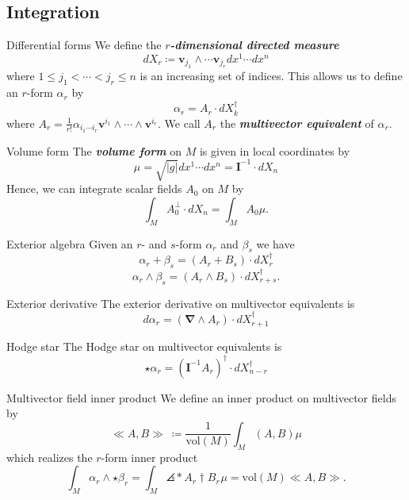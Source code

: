 \documentclass[aspectratio=169,handout]{beamer}
\newcommand\boldgreen[1]{\textcolor{lighter_csu_green}{\emph{\textbf{#1}}}}
\newcommand{\grad}{\boldsymbol{\nabla}}
\newcommand{\blade}[1]{\boldsymbol{#1}}
\newcommand{\multivecinnerproduct}[2]{\ll #1, #2\gg}
\newcommand{\pseudoscalar}{\blade{I}}
\DeclarePairedDelimiter\angles{\langle}{\rangle}
\newcommand{\proj}[2]{\angles*{#2}_{#1}}
\begin{document}
\subsection{Integration}

\begin{frame}{Differential forms}
    We define the \boldgreen{$r$-dimensional directed measure}
    \[
    dX_r\coloneqq \blade{v}_{j_1} \wedge \cdots \blade{v}_{j_r} dx^1 \cdots dx^n
    \]
    where $1\leq j_1<\cdots<j_r\leq n$ is an increasing set of indices. This allows us to define an $r$-form $\alpha_r$ by
    \[
    \alpha_r = A_r \cdot dX_k^\dagger
    \]
    where $A_r = \frac{1}{r!} \alpha_{i_1 \cdots i_r} \blade{v}^{i_1} \wedge \cdots \wedge \blade{v}^{i_r}$. We call $A_r$ the \boldgreen{multivector equivalent} of $\alpha_r$.
\end{frame}

\begin{frame}{Volume form}
\vfill
    The \boldgreen{volume form} on $M$ is given in local coordinates by 
    \[
    \mu = \sqrt{|g|}dx^1\cdots dx^n = \pseudoscalar^{-1} \cdot dX_n
    \]
    Hence, we can integrate scalar fields $A_0$ on $M$ by
    \[
    \int_M A_0^\perp \cdot dX_n =  \int_M A_0 \mu.
    \]
\vfill
\end{frame}

\begin{frame}{Exterior algebra}
\vfill
Given an $r$- and $s$-form $\alpha_r$ and $\beta_s$ we have
\[
\alpha_r + \beta_s = (A_r+B_s) \cdot dX_r^\dagger
\]
\[
\alpha_r \wedge \beta_s = (A_r \wedge B_s) \cdot dX_{r+s}^\dagger.
\]
\vfill
\end{frame}

\begin{frame}{Exterior derivative}
\vfill
The exterior derivative on multivector equivalents is 
\[
d\alpha_r = (\grad \wedge A_r) \cdot dX_{r+1}^\dagger
\]
\vfill
\end{frame}

\begin{frame}{Hodge star}
\vfill
The Hodge star on multivector equivalents is
\[
\star \alpha_r = (\pseudoscalar^{-1} A_r)^\dagger \cdot dX_{n-r}^\dagger
\]
\vfill
\end{frame}


\begin{frame}{Multivector field inner product}
\vfill
We define an inner product on multivector fields by 
\[
\multivecinnerproduct{A}{B}~ \coloneqq \frac{1}{\textrm{vol}(M)} \int_M (A,B)\mu
\]
which realizes the $r$-form inner product
\[
\int_M \alpha_r \wedge \star \beta_r = \int_M \proj{}{A_r\dagger B_r}\mu = \textrm{vol}(M)\multivecinnerproduct{A}{B}.
\]
\vfill
\end{frame}
\end{document}
